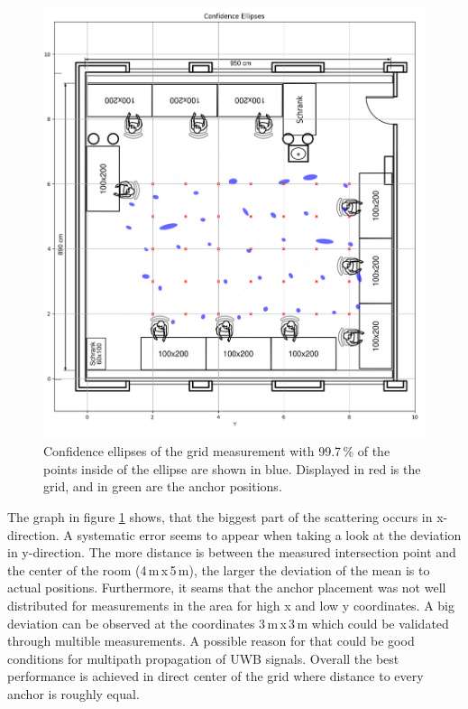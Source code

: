 \documentclass[final, conference, a4paper]{IEEEtran}
\begin{document}
\begin{figure}[hbt!]
	\includegraphics[scale=0.27]{pic/position_plot.png}
	\caption{Confidence ellipses of the grid measurement with 99.7\,\% of the points inside of the ellipse are shown in blue.
	Displayed in red is the grid, and in green are the anchor positions.}
	\label{fig:statistics}
\end{figure}

The graph in figure \ref{fig:statistics} shows, that the biggest part of the scattering occurs in x-direction. 
A systematic error seems to appear when taking a look at the deviation in y-direction. 
The more distance is between the measured intersection point and the center of the room (4\,m\,x\,5\,m), the larger the deviation of the mean is to actual positions. 
Furthermore, it seams that the anchor placement was not well distributed for measurements in the area for high x and low y coordinates. 
A big deviation can be observed at the coordinates 3\,m\,x\,3\,m which could be validated through multible measurements.
A possible reason for that could be good conditions for multipath propagation of \ac{UWB} signals.
Overall the best performance is achieved in direct center of the grid where distance to every anchor is roughly equal.
\end{document}
